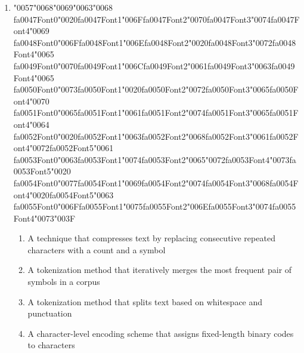 \documentclass[12pt]{article}
\begin{document}
\begin{enumerate}[label=Q\arabic*.]
\item {\char"0057}{\char"0068}{\char"0069}{\char"0063}{\char"0068} {\csname fa0047Font0\endcsname\char"0020}{\csname fa0047Font1\endcsname\char"006F}{\csname fa0047Font2\endcsname\char"0070}{\csname fa0047Font3\endcsname\char"0074}{\csname fa0047Font4\endcsname\char"0069} {\csname fa0048Font0\endcsname\char"006F}{\csname fa0048Font1\endcsname\char"006E}{\csname fa0048Font2\endcsname\char"0020}{\csname fa0048Font3\endcsname\char"0072}{\csname fa0048Font4\endcsname\char"0065} {\csname fa0049Font0\endcsname\char"0070}{\csname fa0049Font1\endcsname\char"006C}{\csname fa0049Font2\endcsname\char"0061}{\csname fa0049Font3\endcsname\char"0063}{\csname fa0049Font4\endcsname\char"0065} {\csname fa0050Font0\endcsname\char"0073}{\csname fa0050Font1\endcsname\char"0020}{\csname fa0050Font2\endcsname\char"0072}{\csname fa0050Font3\endcsname\char"0065}{\csname fa0050Font4\endcsname\char"0070} {\csname fa0051Font0\endcsname\char"0065}{\csname fa0051Font1\endcsname\char"0061}{\csname fa0051Font2\endcsname\char"0074}{\csname fa0051Font3\endcsname\char"0065}{\csname fa0051Font4\endcsname\char"0064} {\csname fa0052Font0\endcsname\char"0020}{\csname fa0052Font1\endcsname\char"0063}{\csname fa0052Font2\endcsname\char"0068}{\csname fa0052Font3\endcsname\char"0061}{\csname fa0052Font4\endcsname\char"0072}{\csname fa0052Font5\endcsname\char"0061} {\csname fa0053Font0\endcsname\char"0063}{\csname fa0053Font1\endcsname\char"0074}{\csname fa0053Font2\endcsname\char"0065}{\char"0072}{\csname fa0053Font4\endcsname\char"0073}{\csname fa0053Font5\endcsname\char"0020} {\csname fa0054Font0\endcsname\char"0077}{\csname fa0054Font1\endcsname\char"0069}{\csname fa0054Font2\endcsname\char"0074}{\csname fa0054Font3\endcsname\char"0068}{\csname fa0054Font4\endcsname\char"0020}{\csname fa0054Font5\endcsname\char"0063} {\csname fa0055Font0\endcsname\char"006F}{\csname fa0055Font1\endcsname\char"0075}{\csname fa0055Font2\endcsname\char"006E}{\csname fa0055Font3\endcsname\char"0074}{\csname fa0055Font4\endcsname\char"0073}{\char"003F}
\begin{enumerate}[label=(\Alph*)]
    \item A technique that compresses text by replacing consecutive repeated characters with a count and a symbol
    \item A tokenization method that iteratively merges the most frequent pair of symbols in a corpus
    \item A tokenization method that splits text based on whitespace and punctuation
    \item A character-level encoding scheme that assigns fixed-length binary codes to characters

\end{enumerate}
\end{enumerate}
\end{document}
